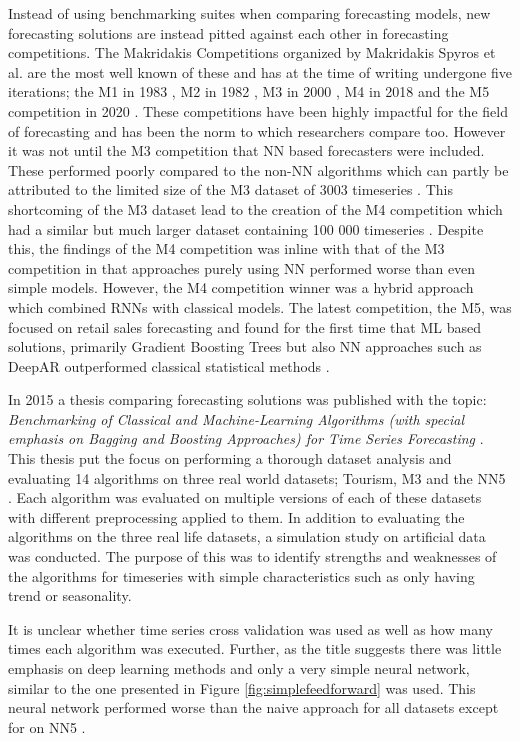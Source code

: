Instead of using benchmarking suites when comparing forecasting models, new forecasting solutions are instead pitted against each other in forecasting competitions. The Makridakis Competitions organized by Makridakis Spyros et al. are the most well known of these and has at the time of writing undergone five iterations; the M1 in 1983 \cite{makridakis1987confidence}, M2 in 1982 \cite{makridakis1993m2}, M3 in 2000 \cite{m3_competition}, M4 in 2018 \cite{makridakis_m4_2020} and the M5 competition in 2020 \cite{m5}. These competitions have been highly impactful for the field of forecasting and has been the norm to which researchers compare too. However it was not until the M3 competition that NN based forecasters were included. These performed poorly compared to the non-NN algorithms which can partly be attributed to the limited size of the M3 dataset of 3003 timeseries \cite{m3_competition}. This shortcoming of the M3 dataset lead to the creation of the M4 competition which had a similar but much larger dataset containing 100 000 timeseries \cite{makridakis_m4_2020}. Despite this, the findings of the M4 competition was inline with that of the M3 competition in that approaches purely using NN performed worse than even simple models. However, the M4 competition winner was a hybrid approach which combined RNNs with classical models. The latest competition, the M5, was focused on retail sales forecasting and found for the first time that ML based solutions, primarily Gradient Boosting Trees but also NN approaches such as DeepAR outperformed classical statistical methods \cite{m5}.

In 2015 a thesis comparing forecasting solutions was published with the topic: \textit{Benchmarking of Classical and Machine-Learning Algorithms (with special emphasis on Bagging and Boosting Approaches) for Time Series Forecasting} \cite{other_thesis}. This thesis put the focus on performing a thorough dataset analysis and evaluating 14 algorithms on three real world datasets; Tourism, M3 and the NN5 \cite{NN5_website}. Each algorithm was evaluated on multiple versions of each of these datasets with different preprocessing applied to them. In addition to evaluating the algorithms on the three real life datasets, a simulation study on artificial data was conducted. The purpose of this was to identify strengths and weaknesses of the algorithms for timeseries with simple characteristics such as only having trend or seasonality.

It is unclear whether time series cross validation was used as well as how many times each algorithm was executed. Further, as the title suggests there was little emphasis on deep learning methods and only a very simple neural network, similar to the one presented in Figure \ref{fig:simplefeedforward} was used. This neural network performed worse than the naive approach for all datasets except for on NN5 \cite{other_thesis}.



